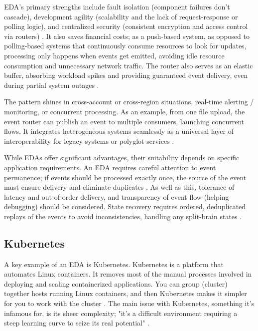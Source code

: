 \documentclass[]{final}
\begin{document}
EDA's primary strengths include fault isolation (component failures don't
cascade), development agility (scalability and the lack of request-response or
polling logic), and centralized security (consistent encryption and access
control via routers) \cite{noauthor_event-driven_nodate}. It also saves financial costs; as a push-based system,
as opposed to polling-based systems that continuously consume resources to
look for updates, processing only happens when events get emitted, avoiding
idle resource consumption and unnecessary network traffic. The router also
serves as an elastic buffer, absorbing workload spikes and providing
guaranteed event delivery, even during partial system outages \cite{noauthor_event-driven_nodate}.

\newpage

The pattern shines in cross-account or cross-region situations, real-time
alerting / monitoring, or concurrent processing. As an example, from one file
upload, the event router can publish an event to multiple consumers, launching
concurrent flows. It integrates heterogeneous systems seamlessly as a universal
layer of interoperability for legacy systems or polyglot services \cite{noauthor_event-driven_nodate}.

While EDAs offer significant advantages, their suitability depends on specific
application requirements. An EDA requires careful attention to event
permanence; if events should be processed exactly once, the source of the
event must ensure delivery and eliminate duplicates \cite{noauthor_event-driven_nodate}. As well as this,
tolerance of latency and out-of-order delivery, and transparency of event
flow (helping debugging) should be considered. State recovery requires
ordered, deduplicated replays of the events to avoid inconsistencies,
handling any split-brain states \cite{noauthor_event-driven_nodate}.

\subsection{Kubernetes}

A key example of an EDA is Kubernetes.
Kubernetes is a platform that automates Linux containers. It removes most of
the manual processes involved in deploying and scaling containerized applications.
You can group (cluster) together hosts running Linux containers, and then
Kubernetes makes it simpler for you to work with the cluster \cite{casey_how_nodate}. The main issue with
Kubernetes, something it's infamous for, is its sheer complexity; "it’s a
difficult environment requiring a steep learning curve to seize its
real potential" \cite{noauthor_why_nodate}.
\end{document}
